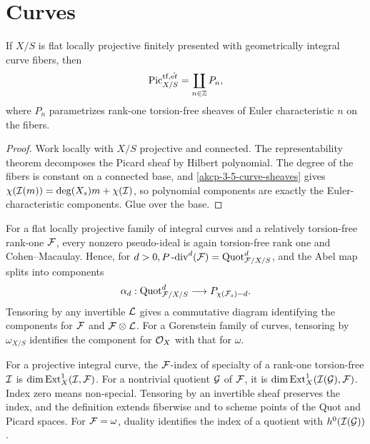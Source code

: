 \section{Curves}

\begin{theorem}
\label{akcp-8-1-curve-picard}
If $X/S$ is flat locally projective finitely presented with geometrically
integral curve fibers, then
\[
\operatorname{Pic}^{\mathrm{tf},\acute{\mathrm et}}_{X/S}=\coprod_{n\in\mathbb Z}P_n,
\]
where $P_n$ parametrizes rank-one torsion-free sheaves of Euler characteristic
$n$ on the fibers.
\end{theorem}
\begin{proof}
Work locally with $X/S$ projective and connected.  The representability theorem
decomposes the Picard sheaf by Hilbert polynomial.  The degree of the fibers is
constant on a connected base, and \cref{akcp-3-5-curve-sheaves} gives
$\chi(\mathcal I(m))=\deg(X_s)m+\chi(\mathcal I)$, so polynomial components are exactly the
Euler-characteristic components.  Glue over the base.
\end{proof}

\begin{definition}
\label{akcp-8-2-abel-components}
For a flat locally projective family of integral curves and a relatively
torsion-free rank-one $\mathcal F$, every nonzero pseudo-ideal is again torsion-free
rank one and Cohen--Macaulay.  Hence, for $d>0,
P\operatorname{-div}^{d}(\mathcal F)=\operatorname{Quot}^{d}_{\mathcal F/X/S}$, and the Abel map splits
into components
\[
\alpha_d:\operatorname{Quot}^{d}_{\mathcal F/X/S}\longrightarrow P_{\chi(\mathcal F_s)-d}.
\]
Tensoring by any invertible $\mathcal L$ gives a commutative diagram identifying the
components for $\mathcal F$ and $\mathcal F\otimes\mathcal L$.  For a Gorenstein family of curves,
tensoring by $\omega_{X/S}$ identifies the component for $\mathcal O_X$ with that for
$\omega$.
\end{definition}

\begin{definition}
\label{akcp-8-3-index-specialty}
For a projective integral curve, the $\mathcal F$-index of specialty of a rank-one
torsion-free $\mathcal I$ is $\dim\operatorname{Ext}^1_X(\mathcal I,\mathcal F)$.  For a nontrivial quotient
$\mathcal G$ of $\mathcal F$, it is $\dim\operatorname{Ext}^1_X(\mathcal I(\mathcal G),\mathcal F)$.  Index zero means
non-special.  Tensoring by an invertible sheaf preserves the index, and the
definition extends fiberwise and to scheme points of the Quot and Picard
spaces.  For $\mathcal F=\omega$, duality identifies the index of a quotient with
$h^0(\mathcal I(\mathcal G))$.
\end{definition}

